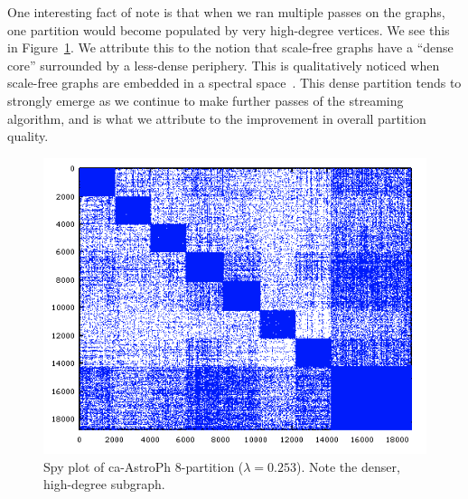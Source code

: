 One interesting fact of note is that when we ran multiple passes on the graphs, one partition would become populated by very high-degree vertices. We see this in Figure~\ref{fig:dense}. We attribute this to the notion that scale-free graphs have a ``dense core'' surrounded by a less-dense periphery. This is qualitatively noticed when scale-free graphs are embedded in a spectral space~\cite{Lang04findinggood}. This dense partition tends to strongly emerge as we continue to make further passes of the streaming algorithm, and is what we attribute to the improvement in overall partition quality.

\begin{figure}[h!]
\centering
  \includegraphics[width=0.8\columnwidth]{figures/astroPh8.png}
  \caption{Spy plot of ca-AstroPh 8-partition ($\lambda=0.253$). Note the denser, high-degree subgraph.}
  \label{fig:dense}
\end{figure}


